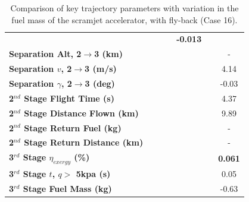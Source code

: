 \begin{table}[ht]
\begin{tabular}{l c c c c c c}
	& \textbf{\secondExergyEffmFuelStandard}
	& \textbf{\secondExergyEffmFuelOneHundredFive}
	& \textbf{\secondExergyEffmFuelOneHundredTen}
	& \textbf{-0.013}
	\\
	\textbf{Separation Alt, 2$\rightarrow$3 (km)}
	& \secondthirdSeparationAltmFuelNinety
	& \secondthirdSeparationAltmFuelNinetyFive
	& \secondthirdSeparationAltmFuelStandard
	& \secondthirdSeparationAltmFuelOneHundredFive
	& \secondthirdSeparationAltmFuelOneHundredTen
	& -
	\\
	\textbf{Separation $v$, 2$\rightarrow$3 (m/s)}
	& \secondthirdSeparationvmFuelNinety
	& \secondthirdSeparationvmFuelNinetyFive
	& \secondthirdSeparationvmFuelStandard
	& \secondthirdSeparationvmFuelOneHundredFive
	& \secondthirdSeparationvmFuelOneHundredTen
	&4.14
	\\
	\textbf{Separation $\gamma$, 2$\rightarrow$3 (deg)}
	& \secondthirdSeparationgammamFuelNinety
	& \secondthirdSeparationgammamFuelNinetyFive
	& \secondthirdSeparationgammamFuelStandard
	& \secondthirdSeparationgammamFuelOneHundredFive
	& \secondthirdSeparationgammamFuelOneHundredTen
	&-0.03
	\\
	\textbf{2$^{nd}$ Stage Flight Time (s)}
	& \secondFlightTimemFuelNinety
	& \secondFlightTimemFuelNinetyFive
	& \secondFlightTimemFuelStandard
	& \secondFlightTimemFuelOneHundredFive
	& \secondFlightTimemFuelOneHundredTen
	&4.37
	\\
	\textbf{2$^{nd}$ Stage Distance Flown (km)}
	& \SecondDistmFuelNinety
	& \SecondDistmFuelNinetyFive
	& \SecondDistmFuelStandard
	& \SecondDistmFuelOneHundredFive
	& \SecondDistmFuelOneHundredTen
	&9.89
	\\
	\textbf{2$^{nd}$ Stage Return Fuel (kg)}
	& \returnFuelmFuelNinety
	& \returnFuelmFuelNinetyFive
	& \returnFuelmFuelStandard
	& \returnFuelmFuelOneHundredFive
	& \returnFuelmFuelOneHundredTen
	& -
	\\
	\textbf{2$^{nd}$ Stage Return Distance (km)}
	& \returnDistmFuelNinety
	& \returnDistmFuelNinetyFive
	& \returnDistmFuelStandard
	& \returnDistmFuelOneHundredFive
	& \returnDistmFuelOneHundredTen
	& -
	\\
	\hline 
	\textbf{3$^{rd}$ Stage $\eta_{exergy}$ (\%)}
	& \textbf{\thirddExergyEffmFuelNinety}
	& \textbf{\thirddExergyEffmFuelNinetyFive}
	& \textbf{\thirddExergyEffmFuelStandard}
	& \textbf{\thirddExergyEffmFuelOneHundredFive}
	& \textbf{\thirddExergyEffmFuelOneHundredTen}
	& \textbf{0.061}
	\\
	\textbf{3$^{rd}$ Stage $t$, $q >$ 5kpa (s)}
	& \thirdqOverFivemFuelNinety
	& \thirdqOverFivemFuelNinetyFive
	& \thirdqOverFivemFuelStandard
	& \thirdqOverFivemFuelOneHundredFive
	& \thirdqOverFivemFuelOneHundredTen
	&0.05
	\\
	\textbf{3$^{rd}$ Stage Fuel Mass (kg)}
	& \thirdmFuelmFuelNinety
	& \thirdmFuelmFuelNinetyFive
	& \thirdmFuelmFuelStandard
	& \thirdmFuelmFuelOneHundredFive
	& \thirdmFuelmFuelOneHundredTen
	&-0.63
	\\
	\hline 
\end{tabular} 
\caption{Comparison of key trajectory parameters with variation in the fuel mass of the scramjet accelerator, with fly-back (Case 16).}
\label{tab:comparison111}
\end{table}
	
